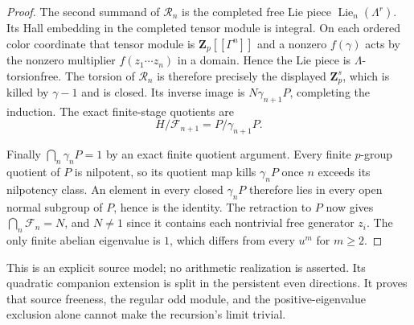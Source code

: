 \begin{proof}
The second summand of $\mathcal R_n$ is the completed free
Lie piece $\operatorname{Lie}_n(\Lambda^r)$.
Its Hall embedding in the completed tensor module
is integral. On each ordered color coordinate that
tensor module is $\mathbf Z_p[[\Gamma^n]]$ and a
nonzero $f(\gamma)$ acts by the nonzero multiplier
$f(z_1\cdots z_n)$ in a domain. Hence the Lie piece
is $\Lambda$-torsionfree. The torsion of $\mathcal R_n$ is
therefore precisely the displayed $\mathbf Z_p^s$,
which is killed by $\gamma-1$ and is closed. Its
inverse image is $N\gamma_{n+1}P$, completing the
induction. The exact finite-stage quotients are
\[
                         H/\mathcal F_{n+1}=P/\gamma_{n+1}P.
\]

Finally $\bigcap_n\gamma_nP=1$ by an exact finite
quotient argument. Every finite $p$-group quotient
of $P$ is nilpotent, so its quotient map kills
$\gamma_nP$ once $n$ exceeds its nilpotency class.
An element in every closed $\gamma_nP$ therefore
lies in every open normal subgroup of $P$, hence is
the identity. The retraction to $P$ now gives
$\bigcap_n\mathcal F_n=N$, and $N\ne1$ since it contains
each nontrivial free generator $z_i$.
The only finite abelian eigenvalue is $1$, which
differs from every $u^m$ for $m\geq2$.
\end{proof}

This is an explicit source model; no arithmetic
realization is asserted. Its quadratic companion
extension is split in the persistent even directions.
It proves that source freeness, the regular odd
module, and the positive-eigenvalue exclusion alone
cannot make the recursion's limit trivial.
